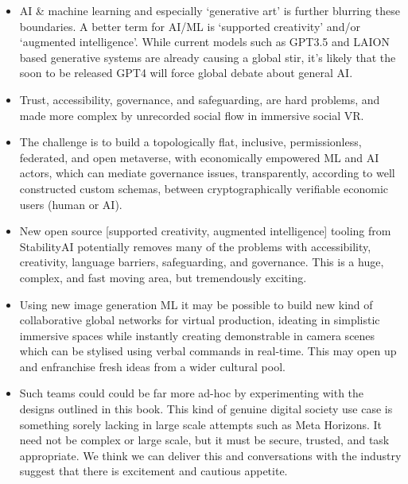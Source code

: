\begin{itemize}
\item AI \& machine learning and especially `generative art' is further blurring these boundaries. A better term for AI/ML is `supported creativity' and/or `augmented intelligence'. While current models such as GPT3.5 and LAION based generative systems are already causing a global stir, it's likely that the soon to be released GPT4 will force global debate about general AI.
\item Trust, accessibility, governance, and safeguarding, are hard problems, and made more complex by unrecorded social flow in immersive social VR.
\item The challenge is to build a topologically flat, inclusive, permissionless, federated, and open metaverse, with economically empowered ML and AI actors, which can mediate governance issues, transparently, according to well constructed custom schemas, between cryptographically verifiable economic users (human or AI).
\item New open source [supported creativity, augmented intelligence] tooling from StabilityAI potentially removes many of the problems with accessibility, creativity, language barriers, safeguarding, and governance. This is a huge, complex, and fast moving area, but tremendously exciting. 
\item Using new image generation ML it may be possible to build new kind of collaborative global networks for virtual production, ideating in simplistic immersive spaces while instantly creating demonstrable in camera scenes which can be stylised using verbal commands in real-time. This may open up and enfranchise fresh ideas from a wider cultural pool.
\item Such teams could could be far more ad-hoc by experimenting with the designs outlined in this book. This kind of genuine digital society use case is something sorely lacking in large scale attempts such as Meta Horizons. It need not be complex or large scale, but it must be secure, trusted, and task appropriate. We think we can deliver this and conversations with the industry suggest that there is excitement and cautious appetite. 
\end{itemize}

